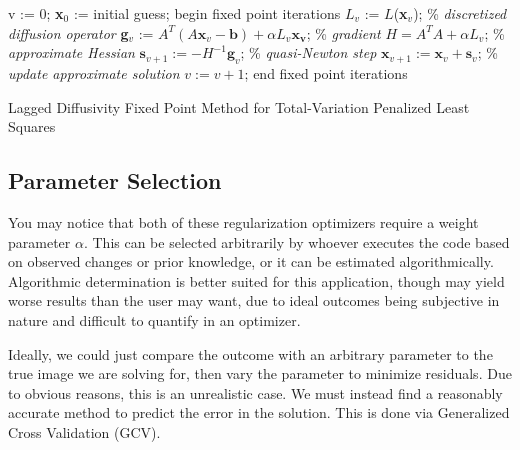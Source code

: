 \documentclass[letterpaper, 11pt, titlepage, twocolumn]{article}
\begin{document}
\begin{algorithm}[H]
            \begin{algorithmic}
                \STATE v := 0;
                \STATE \textbf{x}$_0$ := initial guess;
                \STATE begin fixed point iterations
                \STATE \hspace{2em} $L_v$ := $L$(\textbf{x}$_v$); \hspace{1em} \% \emph{discretized diffusion operator}
                \STATE \hspace{2em} \textbf{g}$_v$ := $A^T(A\mathbf{x}_v - \mathbf{b}) + \alpha L_v\mathbf{x_v}$; \hspace{1em} \% \emph{gradient}
                \STATE \hspace{2em} $H = A^T A + \alpha L_v$; \hspace{1em} \% \emph{approximate Hessian}
                \STATE \hspace{2em} $\mathbf{s}_{v+1} := -H^{-1}\mathbf{g}_v$; \hspace{1em} \% \emph{quasi-Newton step}
                \STATE \hspace{2em} $\mathbf{x}_{v+1} := \mathbf{x}_v + \mathbf{s}_v$; \hspace{1em} \% \emph{update approximate solution}
                \STATE \hspace{2em} $v := v+1$;
                \STATE end fixed point iterations
            \end{algorithmic}
            \caption{Lagged Diffusivity Fixed Point Method for Total-Variation Penalized Least Squares \cite{vogel_computational_2002}}
            \label{alg:seq}
        \end{algorithm}

\subsection{Parameter Selection}
You may notice that both of these regularization optimizers require a weight parameter $\alpha$. This can be selected arbitrarily by whoever executes the code based on observed changes or prior knowledge, or it can be estimated algorithmically. Algorithmic determination is better suited for this application, though may yield worse results than the user may want, due to ideal outcomes being subjective in nature and difficult to quantify in an optimizer.

Ideally, we could just compare the outcome with an arbitrary parameter to the true image we are solving for, then vary the parameter to minimize residuals. Due to obvious reasons, this is an unrealistic case. We must instead find a reasonably accurate method to predict the error in the solution. This is done via Generalized Cross Validation (GCV).
\end{document}
